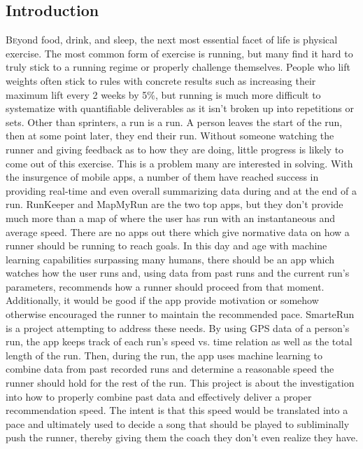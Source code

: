 \documentclass[twoside]{article}
\begin{document}
\begin{multicols}{2} %

\section{Introduction}

\lettrine[nindent=0em,lines=3]{B} eyond food, drink, and sleep, the next most essential facet of life is physical exercise. The most common form of exercise is running, but many find it hard to truly stick to a running regime or properly challenge themselves. People who lift weights often stick to rules with concrete results such as increasing their maximum lift every 2 weeks by 5\%, but running is much more difficult to systematize with quantifiable deliverables as it isn't broken up into repetitions or sets. Other than sprinters, a run is a run. A person leaves the start of the run, then at some point later, they end their run. Without someone watching the runner and giving feedback as to how they are doing, little progress is likely to come out of this exercise. 
This is a problem many are interested in solving. With the insurgence of mobile apps, a number of them have reached success in providing real-time and even overall summarizing data during and at the end of a run. RunKeeper and MapMyRun are the two top apps, but they don't provide much more than a map of where the user has run with an instantaneous and average speed. There are no apps out there which give normative data on how a runner should be running to reach goals. In this day and age with machine learning capabilities surpassing many humans, there should be an app which watches how the user runs and, using data from past runs and the current run's parameters, recommends how a runner should proceed from that moment. Additionally, it would be good if the app provide motivation or somehow otherwise encouraged the runner to maintain the recommended pace. 
	SmarteRun is a project attempting to address these needs. By using GPS data of a person's run, the app keeps track of each run's speed vs. time relation as well as the total length of the run. Then, during the run, the app uses machine learning to combine data from past recorded runs and determine a reasonable speed the runner should hold for the rest of the run. This project is about the investigation into how to properly combine past data and effectively deliver a proper recommendation speed. The intent is that this speed would be translated into a pace and ultimately used to decide a song that should be played to subliminally push the runner, thereby giving them the coach they don't even realize they have. 



\end{multicols}
\end{document}
